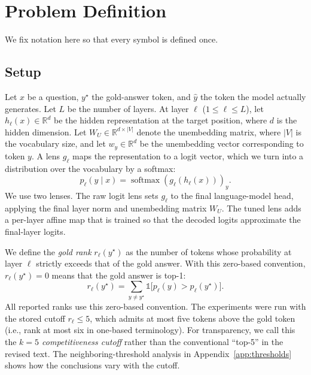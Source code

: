 \documentclass{article} %
\begin{document}
\section{Problem Definition}
\label{sec:def}

We fix notation here so that every symbol is defined once.

\subsection{Setup}
Let $x$ be a question, $y^\star$ the gold-answer token, and $\hat{y}$ the token the model actually generates. Let $L$ be the number of layers. At layer $\ell$ ($1 \le \ell \le L$), let $h_\ell(x) \in \mathbb{R}^d$ be the hidden representation at the target position, where $d$ is the hidden dimension. Let $W_U \in \mathbb{R}^{d \times |V|}$ denote the unembedding matrix, where $|V|$ is the vocabulary size, and let $w_y \in \mathbb{R}^d$ be the unembedding vector corresponding to token $y$. A lens $g_\ell$ maps the representation to a logit vector, which we turn into a distribution over the vocabulary by a softmax:
\begin{equation}
p_\ell(y \mid x) = \operatorname{softmax}(g_\ell(h_\ell(x)))_y .
\end{equation}
We use two lenses. The raw logit lens \citep{nostalgebraist2020logitlens} sets $g_\ell$ to the final language-model head, applying the final layer norm and unembedding matrix $W_U$. The tuned lens \citep{belrose2023tunedlens} adds a per-layer affine map that is trained so that the decoded logits approximate the final-layer logits.

We define the \emph{gold rank} $r_\ell(y^\star)$ as the number of tokens whose probability at layer $\ell$ strictly exceeds that of the gold answer. With this zero-based convention, $r_\ell(y^\star) = 0$ means that the gold answer is top-1:
\begin{equation}
r_\ell(y^\star) = \sum_{y \neq y^\star} \mathbb{1}\big[ p_\ell(y) > p_\ell(y^\star) \big] .
\end{equation}
All reported ranks use this zero-based convention. The experiments were run with the stored cutoff $r_\ell\leq 5$, which admits at most five tokens above the gold token (i.e., rank at most six in one-based terminology). For transparency, we call this the \emph{$k=5$ competitiveness cutoff} rather than the conventional ``top-5'' in the revised text. The neighboring-threshold analysis in Appendix~\ref{app:thresholds} shows how the conclusions vary with the cutoff.
\end{document}
